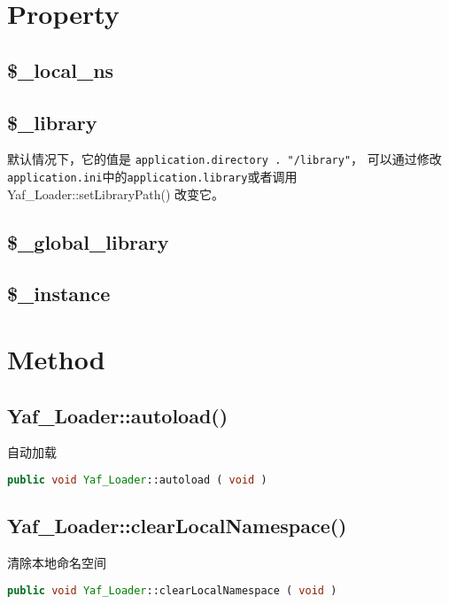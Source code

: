 \section{Property}


\subsection{\$\_local\_ns}



\subsection{\$\_library}



默认情况下，它的值是 \texttt{application.directory . "/library"}， 可以通过修改\texttt{application.ini}中的\texttt{application.library}或者调用 Yaf\_Loader::setLibraryPath() 改变它。

\subsection{\$\_global\_library}


\subsection{\$\_instance}

\section{Method}


\subsection{Yaf\_Loader::autoload()}

自动加载




\begin{lstlisting}[language=PHP]
public void Yaf_Loader::autoload ( void )
\end{lstlisting}

\subsection{Yaf\_Loader::clearLocalNamespace()}

清除本地命名空间

\begin{lstlisting}[language=PHP]
public void Yaf_Loader::clearLocalNamespace ( void )
\end{lstlisting}





